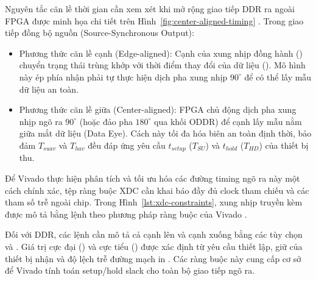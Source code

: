 Nguyên tắc căn lề thời gian cần xem xét khi mở rộng giao tiếp DDR ra ngoài FPGA được minh họa chi tiết trên Hình~\ref{fig:center-aligned-timing} \cite{arumugham2000ddrtiming}. Trong giao tiếp đồng bộ nguồn (Source-Synchronous Output):
\begin{itemize}
    \item {Phương thức căn lề cạnh (Edge-aligned):} Cạnh của xung nhịp đồng hành () chuyển trạng thái trùng khớp với thời điểm thay đổi của dữ liệu (). Mô hình này ép phía nhận phải tự thực hiện dịch pha xung nhịp $90^\circ$ để có thể lấy mẫu dữ liệu an toàn.
    \item {Phương thức căn lề giữa (Center-aligned):} FPGA chủ động dịch pha xung nhịp ngõ ra $90^\circ$ (hoặc đảo pha $180^\circ$ qua khối ODDR) để cạnh lấy mẫu nằm giữa mắt dữ liệu (Data Eye). Cách này tối đa hóa biên an toàn định thời, bảo đảm $T_{suav}$ và $T_{hav}$ đều đáp ứng yêu cầu $t_{setup}$ ($T_{SU}$) và $t_{hold}$ ($T_{HD}$) của thiết bị thu.
\end{itemize}

Để Vivado thực hiện phân tích và tối ưu hóa các đường timing ngõ ra này một cách chính xác, tệp ràng buộc XDC cần khai báo đầy đủ clock tham chiếu và các tham số trễ ngoài chip. Trong Hình~\ref{lst:xdc-constraints}, xung nhịp truyền kèm  được mô tả bằng lệnh  theo phương pháp ràng buộc của Vivado \cite{amd_ug903}.

Đối với DDR, các lệnh  cần mô tả cả cạnh lên và cạnh xuống bằng các tùy chọn  và . Giá trị cực đại () và cực tiểu () được xác định từ yêu cầu thiết lập, giữ của thiết bị nhận và độ lệch trễ đường mạch in \cite{amd_ug903}. Các ràng buộc này cung cấp cơ sở để Vivado tính toán setup/hold slack cho toàn bộ giao tiếp ngõ ra.

